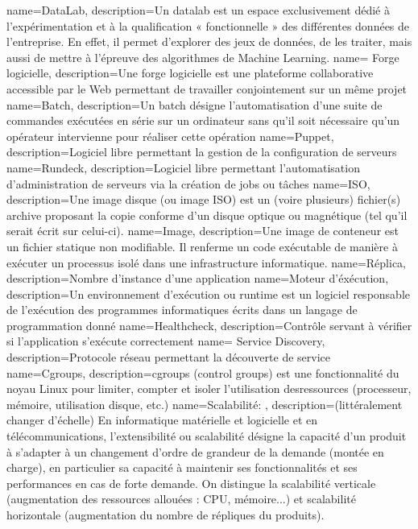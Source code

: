 {
    name=DataLab,
    description={Un datalab est un espace exclusivement dédié à l’expérimentation et à la qualification « fonctionnelle » des différentes données de l’entreprise. En effet, il permet d’explorer des jeux de données, de les traiter, mais aussi de mettre à l’épreuve des algorithmes de Machine Learning.}
}
{
    name= Forge logicielle,
    description={Une forge logicielle est une plateforme collaborative accessible par le Web permettant de travailler conjointement sur un même projet}
}
{
    name=Batch,
    description={Un batch désigne l’automatisation d’une suite de commandes exécutées en série sur un ordinateur sans qu’il soit nécessaire qu’un opérateur intervienne pour réaliser cette opération}
}
{
    name=Puppet,
    description={Logiciel libre permettant la gestion de la configuration de serveurs}
}
{
    name=Rundeck,
    description={Logiciel libre permettant l’automatisation d’administration de serveurs via la création de jobs ou tâches}
}
{
    name=ISO,
    description={Une image disque (ou image ISO) est un (voire plusieurs) fichier(s) archive proposant la copie conforme d'un disque optique ou magnétique (tel qu'il serait écrit sur celui-ci).}
}
{
    name=Image,
    description={Une image de conteneur est un fichier statique non modifiable. Il renferme un code exécutable de manière à exécuter un processus isolé dans une infrastructure informatique.}
}
{
    name=Réplica,
    description={Nombre d’instance d’une application}
}
{
    name=Moteur d'éxécution,
    description={Un environnement d’exécution ou runtime est un logiciel responsable de l’exécution des programmes informatiques écrits dans un langage de programmation donné}
}
{
    name=Healthcheck,
    description={Contrôle servant à vérifier si l’application s’exécute correctement}
}
{
    name= Service Discovery,
    description={Protocole réseau permettant la découverte de service}
}
{
    name=Cgroups,
    description={cgroups (control groups) est une fonctionnalité du noyau Linux pour limiter, compter et isoler l’utilisation desressources (processeur, mémoire, utilisation disque, etc.)}
}
{
    name=Scalabilité: ,
    description={(littéralement changer d'échelle) En informatique matérielle et logicielle et en télécommunications, l’extensibilité ou scalabilité désigne la capacité d'un produit à s'adapter à un changement d'ordre de grandeur de la demande (montée en charge), en particulier sa capacité à maintenir ses fonctionnalités et ses performances en cas de forte demande. On distingue la scalabilité verticale (augmentation des ressources allouées :  CPU, mémoire...) et scalabilité horizontale (augmentation du nombre de répliques du produits).}
}
